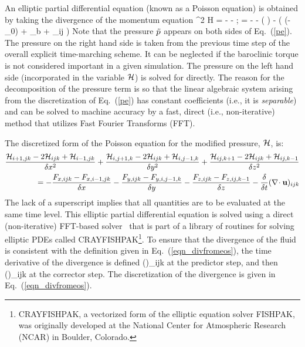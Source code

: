 An elliptic partial differential equation (known as a Poisson equation) is obtained by
taking the divergence of the momentum equation
\be \nabla^2 {\cal H} =
     - - \nabla\!\cdot \bF
    \quad ; \quad \bF = - \bu\times\bo - \tp \nabla \left(  \right) - 
    \Big( (\rho-\rho_0) \bg + \bof_b + \nabla\!\cdot \btau_{ij} \Big)
   \label{pe}\ee
Note that the pressure $\tilde{p}$ appears on both sides of Eq.~(\ref{pe}). The
pressure on the right hand side is taken from the previous time step of the
overall explicit time-marching scheme. It can be neglected if the baroclinic torque is
not considered important in a given simulation. The pressure on the left hand side (incorporated
in the variable $\cal H$) is solved for directly.
The reason for the decomposition of the pressure term is so that the linear algebraic system
arising from the discretization of Eq.~(\ref{pe})
has constant coefficients (i.e., it is {\em separable}) and can be solved to machine accuracy
by a fast, direct (i.e., non-iterative) method that utilizes
Fast Fourier Transforms (FFT).

The discretized form of the
Poisson equation for the modified pressure, ${\cal H}$, is:
\begin{eqnarray}
\frac{{\cal H}_{i+1,jk}-2{\cal H}_{ijk}+{\cal H}_{i-1,jk}}{\delta x^2} +
\frac{{\cal H}_{i,j+1,k}-2{\cal H}_{ijk}+{\cal H}_{i,j-1,k}}{\delta y^2} +
\frac{{\cal H}_{ij,k+1}-2{\cal H}_{ijk}+{\cal H}_{ij,k-1}}{\delta z^2} \nonumber \\ =
    -\frac{F_{x,ijk} - F_{x,i-1,jk}}{\delta x}
    -\frac{F_{y,ijk} - F_{y,i,j-1,k}}{\delta y}
    -\frac{F_{z,ijk} - F_{z,ij,k-1}}{\delta z} - \frac{\delta}{\delta t}(\nabla\!\cdot {\bf u})_{ijk}
\end{eqnarray}
The lack of a superscript implies that all quantities are to be
evaluated at the same time level.
This elliptic partial differential equation is solved using a direct
(non-iterative) FFT-based solver~\cite{Sweet:1} that is part of a library of routines
for solving elliptic PDEs called CRAYFISHPAK\footnote{CRAYFISHPAK, a vectorized form of the
elliptic equation solver FISHPAK, was originally developed at the National Center for Atmospheric
Research (NCAR) in Boulder, Colorado.}.
To ensure that the divergence of the fluid is consistent with the definition
given in Eq.~(\ref{eqn_divfromeos}), the time derivative of the divergence is defined
\be {}(\nabla\!\cdot \bu)_{ijk} \equiv
           \ee
at the predictor step, and then
\be {}(\nabla\!\cdot \bu)_{ijk} \equiv
          \ee
at the corrector step. The discretization of the divergence is
given in Eq.~(\ref{eqn_divfromeos}).


